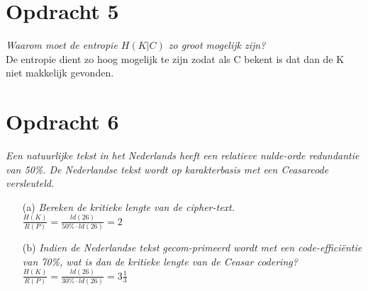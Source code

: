 \section{Opdracht 5}
\emph{Waarom moet de entropie $H(K|C)$ zo groot mogelijk zijn?}\\
De entropie dient zo hoog mogelijk te zijn zodat als C bekent is dat dan de K niet makkelijk gevonden.

\section{Opdracht 6}
\emph{Een natuurlijke tekst in het Nederlands heeft een relatieve nulde-orde redundantie van 50\%. De Nederlandse tekst wordt op karakterbasis met een Ceasarcode versleuteld.}\\
\begin{itemize}
  \item[(a)] \emph{Bereken de kritieke lengte van de cipher-text.}\\
    $\frac{H(K)}{R(P)}=\frac{ld(26)}{50\% \cdot ld(26)}=2$
    
  \item[(b)] \emph{Indien de Nederlandse tekst gecom-primeerd wordt met een code-effici\"{e}ntie van 70\%, wat is dan de kritieke lengte van de Ceasar codering?}\\
    $\frac{H(K)}{R(P)}=\frac{ld(26)}{30\% \cdot ld(26)}=3\frac{1}{3}$
\end{itemize}
